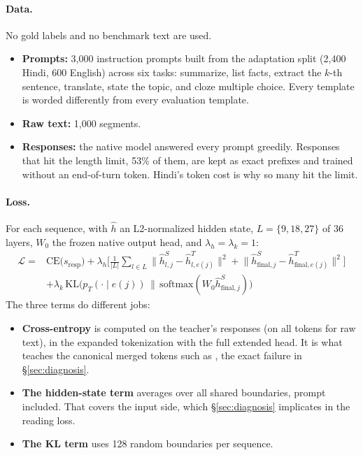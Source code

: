 \documentclass[11pt]{article}
\newcommand{\hi}[1]{{\devfont #1}}
\newcommand{\vsp}{\textvisiblespace}
\begin{document}
\paragraph{Data.} No gold labels and no benchmark text are used.
\begin{itemize}
  \item \textbf{Prompts:} 3,000 instruction prompts built from the adaptation split (2,400 Hindi, 600 English) across six tasks: summarize, list facts, extract the $k$-th sentence, translate, state the topic, and cloze multiple choice. Every template is worded differently from every evaluation template.
  \item \textbf{Raw text:} 1,000 segments.
  \item \textbf{Responses:} the native model answered every prompt greedily. Responses that hit the length limit, 53\% of them, are kept as exact prefixes and trained without an end-of-turn token. Hindi's token cost is why so many hit the limit.
\end{itemize}

\paragraph{Loss.} For each sequence, with $\hat h$ an L2-normalized hidden state, $L=\{9,18,27\}$ of 36 layers, $W_0$ the frozen native output head, and $\lambda_h=\lambda_k=1$:
\begin{equation}
\begin{split}
\mathcal{L} = {}& \mathrm{CE}\big(s_{\text{resp}}\big)
 + \lambda_h \Big[ \tfrac{1}{|L|} \sum_{l \in L} \big\| \hat h^{S}_{l,j} - \hat h^{T}_{l,e(j)} \big\|^2
 + \big\| \hat h^{S}_{\text{final},j} - \hat h^{T}_{\text{final},e(j)} \big\|^2 \Big] \\
 &+ \lambda_k \, \mathrm{KL}\big( p_T(\cdot \mid e(j)) \,\big\|\, \mathrm{softmax}(W_0 \hat h^{S}_{\text{final},j}) \big)
\end{split}
\end{equation}
The three terms do different jobs:
\begin{itemize}
  \item \textbf{Cross-entropy} is computed on the teacher's responses (on all tokens for raw text), in the expanded tokenization with the full extended head. It is what teaches the canonical merged tokens such as \vsp\hi{ज}, the exact failure in \S\ref{sec:diagnosis}.
  \item \textbf{The hidden-state term} averages over all shared boundaries, prompt included. That covers the input side, which \S\ref{sec:diagnosis} implicates in the reading loss.
  \item \textbf{The KL term} \citep{hinton2015distilling} uses 128 random boundaries per sequence.
\end{itemize}
\end{document}
